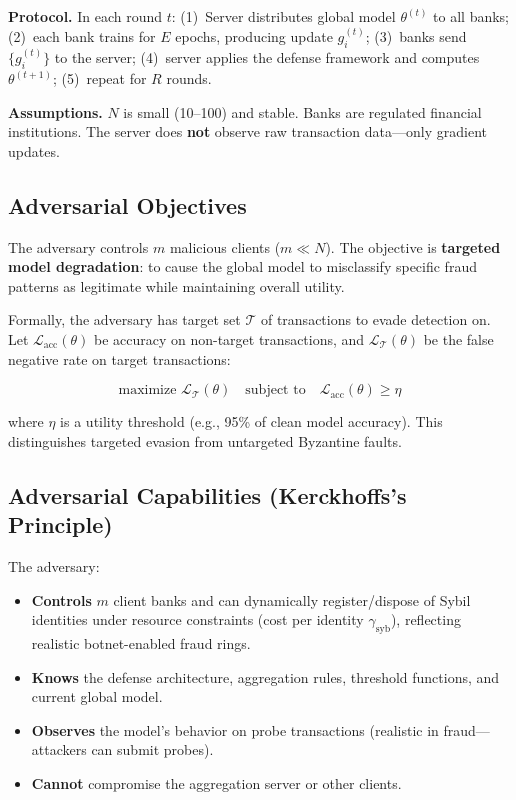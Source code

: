 \documentclass[10pt,journal]{IEEEtran}
\begin{document}
\textbf{Protocol.} In each round $t$: (1)~Server distributes global model $\theta^{(t)}$ to all banks; (2)~each bank trains for $E$ epochs, producing update $g_i^{(t)}$; (3)~banks send $\{g_i^{(t)}\}$ to the server; (4)~server applies the defense framework and computes $\theta^{(t+1)}$; (5)~repeat for $R$ rounds.

\textbf{Assumptions.} $N$ is small (10--100) and stable. Banks are regulated financial institutions. The server does \textbf{not} observe raw transaction data---only gradient updates.

\subsection{Adversarial Objectives}

The adversary controls $m$ malicious clients ($m \ll N$). The objective is \textbf{targeted model degradation}: to cause the global model to misclassify specific fraud patterns as legitimate while maintaining overall utility.

Formally, the adversary has target set $\mathcal{T}$ of transactions to evade detection on. Let $\mathcal{L}_{\text{acc}}(\theta)$ be accuracy on non-target transactions, and $\mathcal{L}_{\mathcal{T}}(\theta)$ be the false negative rate on target transactions:

\begin{equation}
\text{maximize } \mathcal{L}_{\mathcal{T}}(\theta) \quad \text{subject to} \quad \mathcal{L}_{\text{acc}}(\theta) \ge \eta
\end{equation}

where $\eta$ is a utility threshold (e.g., 95\% of clean model accuracy). This distinguishes targeted evasion from untargeted Byzantine faults.

\subsection{Adversarial Capabilities (Kerckhoffs's Principle)}

The adversary:
\begin{itemize}
  \item \textbf{Controls} $m$ client banks and can dynamically register/dispose of Sybil identities under resource constraints (cost per identity $\gamma_{\text{syb}}$), reflecting realistic botnet-enabled fraud rings.
  \item \textbf{Knows} the defense architecture, aggregation rules, threshold functions, and current global model.
  \item \textbf{Observes} the model's behavior on probe transactions (realistic in fraud---attackers can submit probes).
  \item \textbf{Cannot} compromise the aggregation server or other clients.
\end{itemize}
\end{document}
